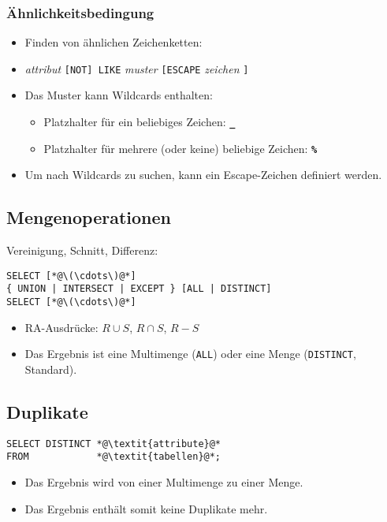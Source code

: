 			\subsubsection{Ähnlichkeitsbedingung} %
				\begin{itemize}
					\item Finden von ähnlichen Zeichenketten:
					\item[] \textit{attribut} \lstinline|[NOT] LIKE| \textit{muster} \lstinline|[ESCAPE| \textit{zeichen} \lstinline|]|
					\item Das Muster kann Wildcards enthalten:
						\begin{itemize}
							\item Platzhalter für ein beliebiges Zeichen: \textbf{\texttt{\_}}
							\item Platzhalter für mehrere (oder keine) beliebige Zeichen: \textbf{\texttt{\%}}
						\end{itemize}
					\item Um nach Wildcards zu suchen, kann ein Escape-Zeichen definiert werden.
				\end{itemize}

		\subsection{Mengenoperationen} %
			Vereinigung, Schnitt, Differenz:
			\begin{lstlisting}
SELECT [*@\(\cdots\)@*]
{ UNION | INTERSECT | EXCEPT } [ALL | DISTINCT]
SELECT [*@\(\cdots\)@*]
            \end{lstlisting}

			\begin{itemize}
				\item RA-Ausdrücke: \( R \cup S \), \( R \cap S \), \( R - S \)
				\item Das Ergebnis ist eine Multimenge (\lstinline|ALL|) oder eine Menge (\lstinline|DISTINCT|, Standard).
			\end{itemize}

		\subsection{Duplikate} %
			\begin{lstlisting}
SELECT DISTINCT *@\textit{attribute}@*
FROM            *@\textit{tabellen}@*;
            \end{lstlisting}

			\begin{itemize}
				\item Das Ergebnis wird von einer Multimenge zu einer Menge.
				\item Das Ergebnis enthält somit keine Duplikate mehr.
			\end{itemize}

